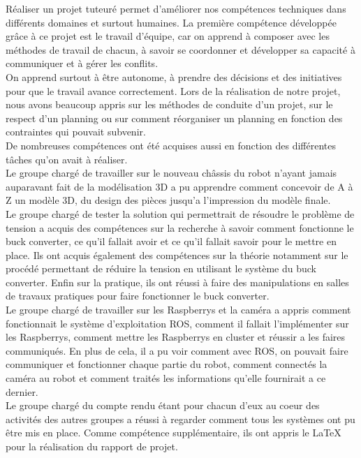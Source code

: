 \documentclass{PackagerQualityN}
\begin{document}
Réaliser un projet tuteuré permet d’améliorer nos compétences techniques dans différents domaines et surtout humaines.
La première compétence développée grâce à ce projet est le travail d’équipe, car on apprend à composer avec les méthodes de travail de chacun, à savoir se coordonner et développer sa capacité à communiquer et à gérer les conflits.\\

On apprend surtout à être autonome, à prendre des décisions et des initiatives pour que le travail avance correctement.
Lors de la réalisation de notre projet, nous avons beaucoup appris sur les méthodes de conduite d'un projet, sur le respect d'un planning ou sur comment réorganiser un planning en fonction des contraintes qui pouvait subvenir.\\

De nombreuses compétences ont été acquises aussi en fonction des différentes tâches qu'on avait à réaliser.\\

Le groupe chargé de travailler sur le nouveau châssis du robot n'ayant jamais auparavant fait de la modélisation 3D a pu apprendre comment concevoir de A à Z un modèle 3D, du design des pièces jusqu'a l'impression du modèle finale.\\

Le groupe chargé de tester la solution qui permettrait de résoudre le problème de tension a acquis des compétences sur la recherche à savoir comment fonctionne le buck converter, ce qu'il fallait avoir et ce qu'il fallait savoir pour le mettre en place. Ils ont acquis également des compétences sur la théorie notamment sur le procédé permettant de réduire la tension en utilisant le système du buck converter. Enfin sur la pratique, ils ont réussi à faire des manipulations en salles de travaux pratiques pour faire fonctionner le buck converter.\\

Le groupe chargé de travailler sur les Raspberrys et la caméra a appris comment fonctionnait le système d'exploitation ROS, comment il fallait l'implémenter sur les Raspberrys, comment mettre les Raspberrys en cluster et réussir a les faires communiqués.
En plus de cela, il a pu voir comment avec ROS, on pouvait faire communiquer et fonctionner chaque partie du robot, comment connectés la caméra au robot et comment traités les informations qu'elle fournirait a ce dernier.\\

Le groupe chargé du compte rendu étant pour chacun d'eux au coeur des activités des autres groupes a réussi à regarder comment tous les systèmes ont pu être mis en place. Comme compétence supplémentaire, ils ont appris le LaTeX pour la réalisation du rapport de projet.
\end{document}
